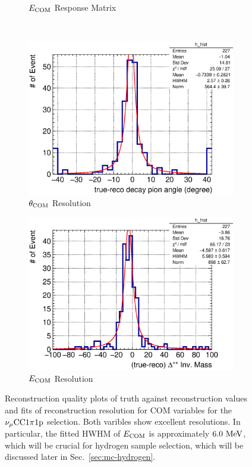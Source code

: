 \begin{figure}
\begin{subfigure}[b]{\dbfigwid\textwidth}
               \caption{$E_{\textrm{COM}}$ Response Matrix}
               \label{subfig:reco-com-e-resmat}
          \end{subfigure}
          \\
          \begin{subfigure}[b]{\dbfigwid\textwidth}
               \centering
               \includegraphics[width=\textwidth]{figures/COM/SFGpTPCmu_dang_res_hist_al15.eps}
               \caption{$\theta_{\textrm{COM}}$ Resolution}
               \label{subfig:reco-com-t-res}
          \end{subfigure}
          \begin{subfigure}[b]{\dbfigwid\textwidth}
               \centering
               \includegraphics[width=\textwidth]{figures/COM/SFGpTPCmu_edelta_res_hist_al15.eps}
               \caption{$E_{\textrm{COM}}$ Resolution}
               \label{subfig:reco-com-e-res}
          \end{subfigure}
          \caption{Reconstruction quality plots of truth against reconstruction values and fits of reconstruction resolution for COM variables for the $\nu_{\mu}\textrm{CC}1\pi1\textrm{p}$ selection. Both varibles show excellent resolutions. In particular, the fitted HWHM of $E_{\textrm{COM}}$ is approximately $6.0~\textrm{MeV}$, which will be crucial for hydrogen sample selection, which will be discussed later in Sec.~\ref{sec:mc-hydrogen}.}
          \label{fig:com-reco}
     \end{figure}
